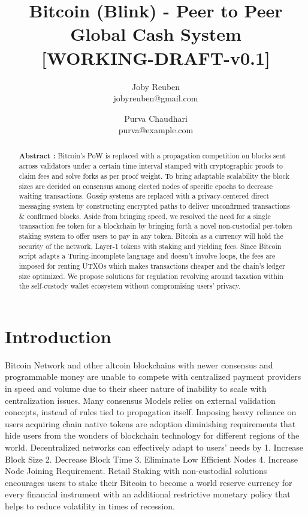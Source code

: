 \documentclass[a4paper,10pt]{article}
\title{
 \large \textbf{Bitcoin (Blink) - Peer to Peer Global Cash System}\\
\vspace{6mm}
\scriptsize [WORKING-DRAFT-v0.1]
}
\author{ \myfontt Joby Reuben \\ \myfontt jobyreuben@gmail.com \and  \myfontt Purva Chaudhari \\ \myfontt purva@example.com}
\date{}
\begin{document}
\maketitle
\begin{abstract}
\noindent \textbf{Abstract :} Bitcoin's PoW is replaced with a propagation competition on blocks sent across validators under a certain time interval stamped with cryptographic proofs to claim fees and solve forks as per proof weight. To bring adaptable scalability the block sizes are decided on consensus among elected nodes of specific epochs to decrease waiting transactions. Gossip systems are replaced with a privacy-centered direct messaging system by constructing encrypted paths to deliver unconfirmed transactions \& confirmed blocks. Aside from bringing speed, we resolved the need for a single transaction fee token for a blockchain by bringing forth a novel non-custodial per-token staking system to offer users to pay in any token. Bitcoin as a currency will hold the security of the network, Layer-1 tokens with staking and yielding fees. Since Bitcoin script adapts a Turing-incomplete language and doesn't involve loops, the fees are imposed for renting UTXOs which makes transactions cheaper and the chain's ledger size optimized. We propose solutions for regulation revolving around taxation within the self-custody wallet ecosystem without compromising users' privacy. 

\end{abstract}

\section{Introduction}
Bitcoin Network and other altcoin blockchains with newer consensus and programmable money are unable to compete with centralized payment providers in speed and volume due to their sheer nature of inability to scale with centralization issues. Many consensus Models relies on external validation concepts, instead of rules tied to propagation itself. Imposing heavy reliance on users acquiring chain native tokens are adoption diminishing requirements that hide users from the wonders of blockchain technology for different regions of the world. Decentralized networks can effectively adapt to users' needs by 1. Increase Block Size 2. Decrease Block Time 3. Eliminate Low Efficient Nodes 4. Increase Node Joining Requirement. Retail Staking with non-custodial solutions encourages users to stake their Bitcoin to become a world reserve currency for every financial instrument with an additional restrictive monetary policy that helps to reduce volatility in times of recession.
\end{document}
